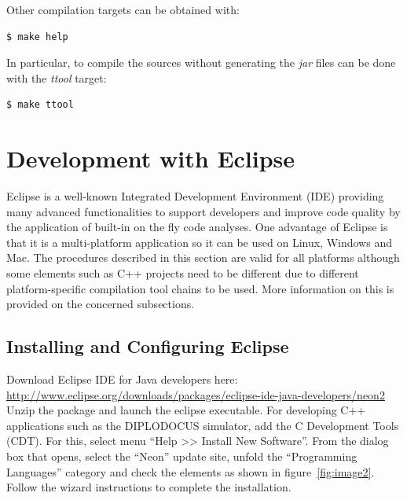 \documentclass[12pt]{article}
\begin{document}
Other compilation targets can be obtained with:
\begin{verbatim}
$ make help
\end{verbatim}
In particular, to compile the sources without generating the \textit{jar} files can be done with the \textit{ttool} target:
  \begin{verbatim}
$ make ttool
\end{verbatim}



\section{Development with Eclipse}

Eclipse is a well-known Integrated Development Environment (IDE) providing many advanced functionalities to support developers and improve code quality by the application of built-in on the fly code analyses. One advantage of Eclipse is that it is a multi-platform application so it can be used on Linux, Windows and Mac. The procedures described in this section are valid for all platforms although some elements such as C++ projects need to be different due to different platform-specific compilation tool chains to be used. More information on this is provided on the concerned subsections. \\

\subsection{Installing and Configuring Eclipse}

Download Eclipse IDE for Java developers here: \\
\url{http://www.eclipse.org/downloads/packages/eclipse-ide-java-developers/neon2}
\\

Unzip the package and launch the eclipse executable. For developing C++
applications such as the DIPLODOCUS simulator, add the C Development Tools
(CDT). For this, select menu ``Help >> Install New Software''.
From the dialog box that opens, select the ``Neon'' update site, unfold the
``Programming Languages'' category and check the elements as shown in
figure~\ref{fig:image2}. Follow the wizard instructions to complete the
installation.
\end{document}
